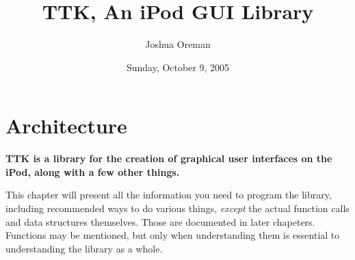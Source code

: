 \documentclass[12pt,letterpaper]{report}
\title{TTK, An iPod GUI Library}
\author{Joshua Oreman}
\date{Sunday, October 9, 2005}
\begin{document}
\maketitle
\tableofcontents

\chapter{Architecture}
{\bf TTK is a library for the creation of graphical user interfaces on the iPod, along with a few other things.}

\noindent This chapter will present all the information you need to program the library, including
recommended ways to do various things, \emph{except} the actual function calls and data structures themselves.
Those are documented in later chapeters. Functions may be mentioned, but only when understanding
them is essential to understanding the library as a whole.
\end{document}
